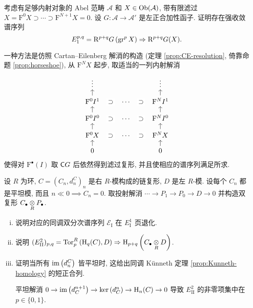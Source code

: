 \begin{Exercises}
	\item 考虑有足够内射对象的 Abel 范畴 $\mathcal{A}$ 和 $X \in \operatorname{Ob}(\mathcal{A})$, 带有限滤过 $X = \mathrm{F}^0 X \supset \cdots \supset \mathrm{F}^{N+1} X = 0$. 设 $G: \mathcal{A} \to \mathcal{A}'$ 是左正合加性函子. 证明存在强收敛谱序列
	\[ E_1^{p,q} = \mathrm{R}^{p+q} G \left( \operatorname{gr}^p X \right) \Rightarrow \mathrm{R}^{p+q}G(X). \]
	\begin{hint}
		一种方法是仿照 Cartan--Eilenberg 解消的构造 (定理 \ref{prop:CE-resolution}, 倚靠命题 \ref{prop:horseshoe}), 从 $\mathrm{F}^N X$ 起步, 取适当的一列内射解消
		\[\begin{tikzcd}[row sep=small]
			\vdots & & \vdots \\
			\mathrm{F}^0 I^1 \arrow[u] \arrow[phantom, r, "\supset" description] & \cdots \arrow[phantom, r, "\supset" description] & \mathrm{F}^N I^1 \arrow[u] \\
			\mathrm{F}^0 I^0 \arrow[u] \arrow[phantom, r, "\supset" description] & \cdots \arrow[phantom, r, "\supset" description] & \mathrm{F}^N I^0 \arrow[u] \\
			\mathrm{F}^0 X \arrow[u] \arrow[phantom, r, "\supset" description] & \cdots \arrow[phantom, r, "\supset" description] & \mathrm{F}^N X \arrow[u] \\
			0 \arrow[u] & & 0 \arrow[u]
		\end{tikzcd}\]
		使得对 $\mathrm{F}^\bullet (I)$ 取 $\mathsf{C}G$ 后依然得到滤过复形, 并且使相应的谱序列满足所求.
	\end{hint}

	\item 设 $R$ 为环, $C = \left(C_n, d^C_n\right)_n$ 是右 $R$-模构成的链复形, $D$ 是左 $R$-模. 设每个 $C_n$ 都是平坦模, 而且 $n \ll 0 \implies C_n = 0$. 取投射解消 $\cdots \to P_1 \to P_0 \to D \to 0$ 并构造双复形 $C_\bullet \underset{R}{\otimes} P_\bullet$.
	\begin{enumerate}[(i)]
		\item 说明对应的同调双分次谱序列 $\mathscr{E}_{\mathrm{I}}$ 在 $E_{\mathrm{I}}^1$ 页退化.
		\item 说明 $(E_{\mathrm{II}}^2)_{p,q} = \operatorname{Tor}^R_p\left( \operatorname{H}_q(C), D \right) \Rightarrow \operatorname{H}_{p+q}\left( C_\bullet \underset{R}{\otimes} D \right)$.
		\item 证明当所有 $\operatorname{im}\left( d^C_n \right)$ 皆平坦时, 这给出同调 Künneth 定理 \ref{prop:Kunneth-homology} 的短正合列.
		\begin{hint}
			平坦解消 $0 \to \operatorname{im}\left( d_C^{n+1} \right) \to \operatorname{ker}\left(d_C^n\right) \to \operatorname{H}_n(C) \to 0$ 导致 $E_{\mathrm{II}}^2$ 的非零项集中在 $p \in \{0, 1\}$.
		\end{hint}
	\end{enumerate}


\end{Exercises}
